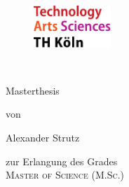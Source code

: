 
\begin{titlepage}

\begin{center}

\begin{figure}[!ht]
	\flushleft
		\includegraphics[width=0.26\textwidth]{Figures/THlogoheader.pdf}
\end{figure}

\vspace{0.8cm}

\begin{rmfamily}
\vspace{0.5cm}
\begin{huge}
\textbf{\ttitle}\\	
\end{huge}
\vspace{0.5cm}
\end{rmfamily}

\vspace{1.6cm}


\begin{LARGE}
\begin{scshape}
Masterthesis\\[0.8em]
\end{scshape}
\end{LARGE}

\begin{large}
von\\ 
\vspace{0.2cm}
\begin{LARGE}
Alexander Strutz\\
\end{LARGE}
\end{large}

\vspace{1.0cm}

\begin{large}
zur Erlangung des Grades\\
\vspace{0.4cm}
\textsc{Master of Science (M.Sc.)}\\ 
\end{large}


\end{center}
\end{titlepage}
